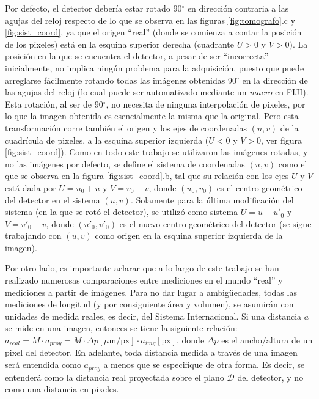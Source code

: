 Por defecto, el detector debería estar rotado 90$^{\circ}$ en dirección contraria a las agujas del
reloj respecto de lo que se observa en las
figuras \ref{fig:tomografo}.c y \ref{fig:sist_coord}, ya que el origen ``real'' (donde se comienza
a contar la posición de los pixeles) está en la esquina superior derecha (cuadrante $U>0$ y
$V>0$). La posición en la que se encuentra el detector, a pesar de ser ``incorrecta'' inicialmente, no
implica ningún problema para la adquisición, puesto que puede arreglarse fácilmente rotando
todas las imágenes obtenidas 90$^{\circ}$ en la dirección de las agujas del reloj (lo cual puede ser
automatizado mediante un \textit{macro} en FIJI). Esta rotación, al ser de 90$^{\circ}$, no necesita de ninguna
interpolación de pixeles, por lo que la imagen obtenida es esencialmente la misma que la
original. Pero esta transformación corre también el origen y los ejes de coordenadas $(u,v)$ de
la cuadrícula de pixeles, a la esquina superior izquierda ($U<0$ y $V>0$, ver figura
\ref{fig:sist_coord}). Como en todo este trabajo se utilizaron las imágenes rotadas, y no
las imágenes por defecto, se define el sistema de coordenadas $(u,v)$ como el que se observa en la
figura \ref{fig:sist_coord}.b, tal que su relación con los ejes $U$ y $V$ está dada por
$U = u_0 + u$ y $V = v_0 - v$, donde $(u_0,v_0)$ es el centro geométrico del detector en el
sistema $(u,v)$. Solamente para la última modificación del sistema (en la que se rotó el detector),
se utilizó como sistema $U = u - u'_0$ y $V = v'_0 - v$, donde $(u'_0,v'_0)$ es el nuevo centro geométrico
del detector (se sigue trabajando con $(u,v)$ como origen en la esquina superior izquierda de la imagen).

Por otro lado, es importante aclarar que a lo largo de este trabajo se han realizado numerosas
comparaciones entre mediciones en el mundo ``real'' y mediciones a partir de imágenes. Para
no dar lugar a ambigüedades, todas las mediciones de longitud (y por consiguiente área y volumen),
se asumirán con unidades de medida reales, es decir, del Sistema Internacional. Si una distancia $a$ se mide en una imagen,
entonces se tiene la siguiente relación: $a_{real} = M\cdot a_{proy} = M\cdot \Delta p
[\mu\text{m/px}] \cdot a_{img}[\text{px}]$,
donde $\Delta p$ es el ancho/altura de un pixel del detector. En adelante, toda distancia
medida a través de una imagen será entendida como $a_{proy}$ a menos que se especifique de
otra forma. Es decir, se entenderá como la distancia real proyectada sobre el plano $\mathcal{D}$
del detector, y no como una distancia en pixeles.

